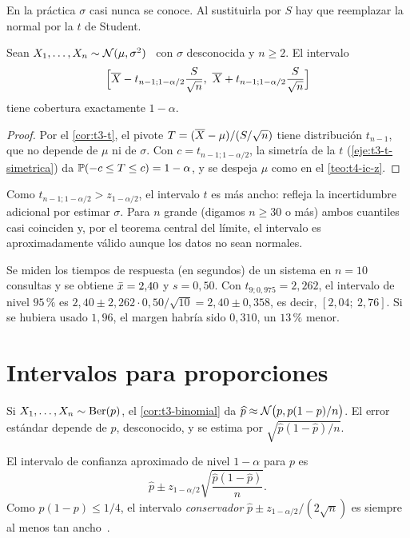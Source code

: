 En la práctica $\sigma$ casi nunca se conoce. Al sustituirla por $S$ hay que reemplazar la normal por la $t$ de Student.

\begin{teorema}[Intervalo $t$]\label{teo:t4-ic-t}
Sean $X_1,\dots,X_n\sim\mathcal{N}(\mu,\sigma^{2})$ \iid\ con $\sigma$ desconocida y $n\ge2$. El intervalo
\[
\Bigl[\Xbar-t_{n-1;1-\alpha/2}\frac{S}{\sqrt n},\ \Xbar+t_{n-1;1-\alpha/2}\frac{S}{\sqrt n}\Bigr]
\]
tiene cobertura exactamente $1-\alpha$.
\end{teorema}

\begin{proof}
Por el \cref{cor:t3-t}, el pivote $T=(\overline{X}-\mu)/(S/\sqrt n)$ tiene distribución $t_{n-1}$, que no depende de $\mu$ ni de $\sigma$. Con $c=t_{n-1;1-\alpha/2}$, la simetría de la $t$ (\cref{eje:t3-t-simetrica}) da $\mathbb{P}(-c\le T\le c)=1-\alpha$, y se despeja $\mu$ como en el \cref{teo:t4-ic-z}.
\end{proof}

Como $t_{n-1;1-\alpha/2}>z_{1-\alpha/2}$, el intervalo $t$ es más ancho: refleja la incertidumbre adicional por estimar $\sigma$. Para $n$ grande (digamos $n\ge30$ o más) ambos cuantiles casi coinciden y, por el teorema central del límite, el intervalo es aproximadamente válido aunque los datos no sean normales.

\begin{ejemplo}\label{ej:t4-t}
Se miden los tiempos de respuesta (en segundos) de un sistema en $n=10$ consultas y se obtiene $\bar{x}=2{,}40$ y $s=0{,}50$. Con $t_{9;0{,}975}=2{,}262$, el intervalo de nivel $95\,\%$ es $2{,}40\pm2{,}262\cdot0{,}50/\sqrt{10}=2{,}40\pm0{,}358$, es decir, $[2{,}04;\allowbreak\ 2{,}76]$. Si se hubiera usado $1{,}96$, el margen habría sido $0{,}310$, un $13\,\%$ menor.
\end{ejemplo}

\section{Intervalos para proporciones}

Si $X_1,\dots,X_n\sim\operatorname{Ber}(p)$, el \cref{cor:t3-binomial} da $\widehat p\approx\mathcal{N}\bigl(p,p(1-p)/n\bigr)$. El error estándar depende de $p$, desconocido, y se estima por $\sqrt{\widehat p(1-\widehat p)/n}$.

\begin{definicion}\label{def:t4-wald}
El intervalo de confianza aproximado de nivel $1-\alpha$ para $p$ es
\[
\widehat p\pm z_{1-\alpha/2}\sqrt{\frac{\widehat p(1-\widehat p)}{n}}.
\]
Como $p(1-p)\le1/4$, el intervalo \emph{conservador} $\widehat p\pm z_{1-\alpha/2}/(2\sqrt n)$ es siempre al menos tan ancho~\cite[§8.3]{openstax}.
\end{definicion}

